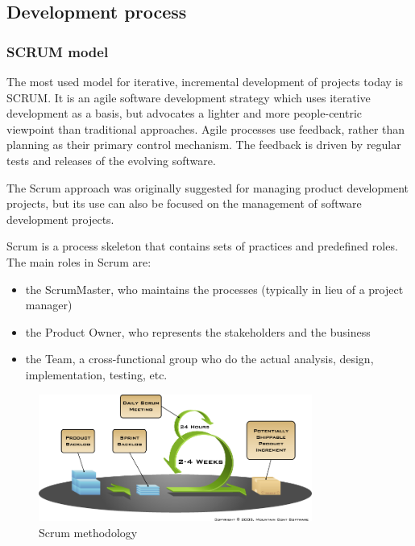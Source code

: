 \subsection{Development process}

\subsubsection{SCRUM model}
	
The most used model for iterative, incremental development of projects today
is SCRUM\cite{scrumi}. It is an agile software development strategy which uses iterative
development as a basis, but advocates a lighter and more people-centric viewpoint
than traditional approaches. Agile processes use feedback, rather than planning
as their primary control mechanism. The feedback is driven by regular tests and
releases of the evolving software\cite{wiki:development-process}.\newline
	
The Scrum approach was originally suggested for managing product development
projects, but its use can also be focused on the management of software development projects.\newline
	
Scrum is a process skeleton that contains sets of practices and predefined roles.
The main roles in Scrum are:	
\begin{itemize}
	\item the ScrumMaster, who maintains the processes (typically in lieu of a project manager)
	\item the Product Owner, who represents the stakeholders and the business
	\item the Team, a cross-functional group who do the actual analysis, design, implementation, testing, etc.
\end{itemize}

\begin{figure}[htb]
	\centering
	\includegraphics[width=0.8\textwidth]{prestudy/development_process/scrum.png}
	\caption{Scrum methodology\cite{targetprocess:scrum}}
	\label{fig:scrum-methology}
\end{figure}

